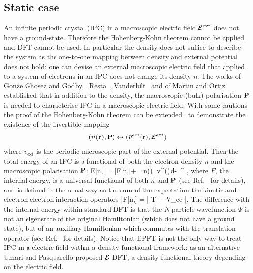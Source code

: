 \subsection{Static case}
An infinite periodic crystal (IPC) in a macroscopic electric field $\boldsymbol{\cal E}^{\text{ext}}$ does not have a ground-state. Therefore the Hohenberg-Kohn theorem cannot be applied and DFT cannot be used. In particular the density does not suffice to describe the system as the one-to-one mapping between density and external potential does not hold: one can devise an external macroscopic electric field that applied to a system of electrons in an IPC does not change its density $n$.
The works of Gonze Ghosez and Godby,~\cite{Gonze1995} Resta~\cite{Resta1996}, Vanderbilt~\cite{Vanderbilt1997} and of Martin and Ortiz~\cite{Martin1997} established that in addition to the density, the macroscopic (bulk) polarisation ${\bf P}$ is needed to characterise IPC in a macroscopic electric field. With some cautions the proof of the Hohenberg-Kohn theorem can be extended~\cite{Martin1997} to demonstrate the existence of the invertible mapping
$$(n({\bf r}),{\bf P})\leftrightarrow (\bar v^{\text{ext}}({\bf r}),\boldsymbol{\cal E}^{\text{ext}}) $$
where $ \bar v_{\text{ext}}$ is the periodic microscopic part of the external potential.
Then the total energy of an IPC is a functional of both the electron density $n$ and the macroscopic polarisation ${\bf P}$:
\be \label{eq:dpften}
E[n,\PP] = \bar F[n,\PP]+ \int_\Omega n(\rr) \bar v^{}(\rr)\,d\rr  -\Omega\, \Efield^{} \cdot \PP,
\ee 
where $\bar F$, the internal energy, is a universal functional of both $n$ and ${\bf P}$ (see Ref.~\cite{Martin1997} for details),
and is defined in the usual way
as the sum of the expectation the kinetic and electron-electron interaction operators
\be
\bar F[n,\PP] = \langle \Psi | \hat T + \hat V_{ee} |\Psi \rangle.
\ee 
The difference with the internal energy within standard DFT is that the $N$-particle wavefunction $\Psi$ is not an eigenstate of the original Hamiltonian (which does not have a ground state), but of an auxiliary Hamiltonian which commutes with the translation operator (see Ref.~\cite{Martin1997} for details). Notice that DPFT is not the only way to treat IPC in a electric field within a density functional framework: as an alternative Umari and Pasquarello proposed $\boldsymbol{\cal E}$-DFT, a density functional theory depending on the electric field.~\cite{Umari2005}   

